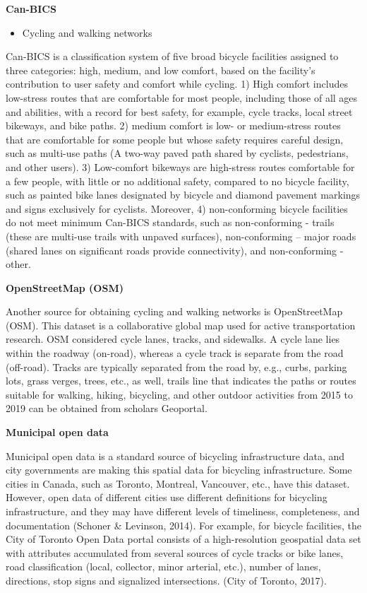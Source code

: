 \documentclass[
11pt, %
oneside, %
english, %
singlespacing, %
]{macthesis} %
\def\tightlist{}
\begin{document}
\newpage

\textbf{Can-BICS}

\begin{itemize}
\tightlist
\item
  Cycling and walking networks
\end{itemize}

Can-BICS is a classification system of five broad bicycle facilities assigned to three categories: high, medium, and low comfort, based on the facility's contribution to user safety and comfort while cycling. 1) High comfort includes low-stress routes that are comfortable for most people, including those of all ages and abilities, with a record for best safety, for example, cycle tracks, local street bikeways, and bike paths. 2) medium comfort is low- or medium-stress routes that are comfortable for some people but whose safety requires careful design, such as multi-use paths (A two-way paved path shared by cyclists, pedestrians, and other users). 3) Low-comfort bikeways are high-stress routes comfortable for a few people, with little or no additional safety, compared to no bicycle facility, such as painted bike lanes designated by bicycle and diamond pavement markings and signs exclusively for cyclists. Moreover, 4) non-conforming bicycle facilities do not meet minimum Can-BICS standards, such as non-conforming - trails (these are multi-use trails with unpaved surfaces), non-conforming -- major roads (shared lanes on significant roads provide connectivity), and non-conforming - other.

\textbf{OpenStreetMap (OSM)}

Another source for obtaining cycling and walking networks is OpenStreetMap (OSM). This dataset is a collaborative global map used for active transportation research. OSM considered cycle lanes, tracks, and sidewalks. A cycle lane lies within the roadway (on-road), whereas a cycle track is separate from the road (off-road). Tracks are typically separated from the road by, e.g., curbs, parking lots, grass verges, trees, etc., as well, trails line that indicates the paths or routes suitable for walking, hiking, bicycling, and other outdoor activities from 2015 to 2019 can be obtained from scholars Geoportal.

\textbf{Municipal open data}

Municipal open data is a standard source of bicycling infrastructure data, and city governments are making this spatial data for bicycling infrastructure. Some cities in Canada, such as Toronto, Montreal, Vancouver, etc., have this dataset. However, open data of different cities use different definitions for bicycling infrastructure, and they may have different levels of timeliness, completeness, and documentation (Schoner \& Levinson, 2014). For example, for bicycle facilities, the City of Toronto Open Data portal consists of a high-resolution geospatial data set with attributes accumulated from several sources of cycle tracks or bike lanes, road classification (local, collector, minor arterial, etc.), number of lanes, directions, stop signs and signalized intersections. (City of Toronto, 2017).
\end{document}
